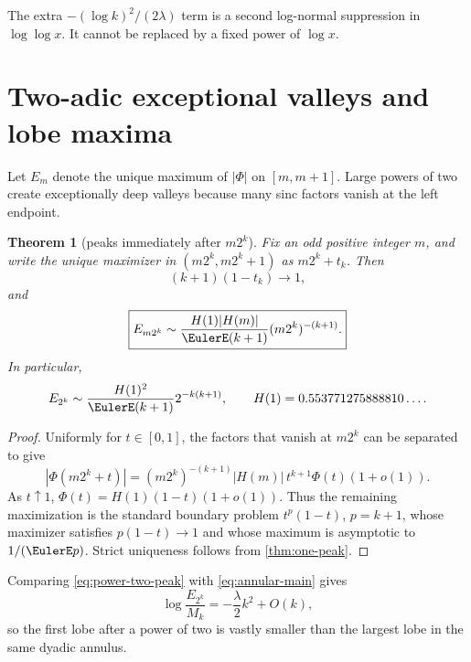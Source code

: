 \documentclass[11pt,oneside]{article}
\newtheorem{theorem}{Theorem}[section]
\theoremstyle{definition}
\theoremstyle{remark}
\begin{document}
The extra \(- (\log k)^2/(2\lambda)\) term is a second log-normal suppression
in \(\log\log x\).  It cannot be replaced by a fixed power of \(\log x\).

\section{Two-adic exceptional valleys and lobe maxima}
\label{sec:two-adic}

Let \(E_m\) denote the unique maximum of \(|\Phi|\) on \([m,m+1]\).  Large
powers of two create exceptionally deep valleys because many sinc factors
vanish at the left endpoint.

\begin{theorem}[peaks immediately after \(m2^k\)]
\label{thm:two-adic-peaks}
Fix an odd positive integer \(m\), and write the unique maximizer in
\((m2^k,m2^k+1)\) as \(m2^k+t_k\).  Then
\begin{equation}
 (k+1)(1-t_k)\longrightarrow1,
 \label{eq:peak-location}
\end{equation}
and
\begin{equation}
 \boxed{
 E_{m2^k}\sim
 \frac{H(1)|H(m)|}{\EulerE(k+1)}(m2^k)^{-(k+1)}.}
 \label{eq:two-adic-peak}
\end{equation}
In particular,
\begin{equation}
 E_{2^k}\sim\frac{H(1)^2}{\EulerE(k+1)}2^{-k(k+1)},
 \qquad H(1)=0.553771275888810\ldots .
 \label{eq:power-two-peak}
\end{equation}
\end{theorem}

\begin{proof}
Uniformly for \(t\in[0,1]\), the factors that vanish at \(m2^k\) can be
separated to give
\begin{equation}
 |\Phi(m2^k+t)|
 =(m2^k)^{-(k+1)}|H(m)|\,t^{k+1}\Phi(t)(1+o(1)).
 \label{eq:near-two-adic-factor}
\end{equation}
As \(t\uparrow1\),
\(\Phi(t)=H(1)(1-t)(1+o(1))\).  Thus the remaining maximization is the
standard boundary problem
\(t^p(1-t)\), \(p=k+1\), whose maximizer satisfies
\(p(1-t)\to1\) and whose maximum is asymptotic to \(1/(\EulerE p)\).
Strict uniqueness follows from \cref{thm:one-peak}.
\end{proof}

Comparing \eqref{eq:power-two-peak} with \eqref{eq:annular-main} gives
\[
 \log\frac{E_{2^k}}{M_k}=-\frac\lambda2k^2+O(k),
\]
so the first lobe after a power of two is vastly smaller than the largest lobe
in the same dyadic annulus.
\end{document}
